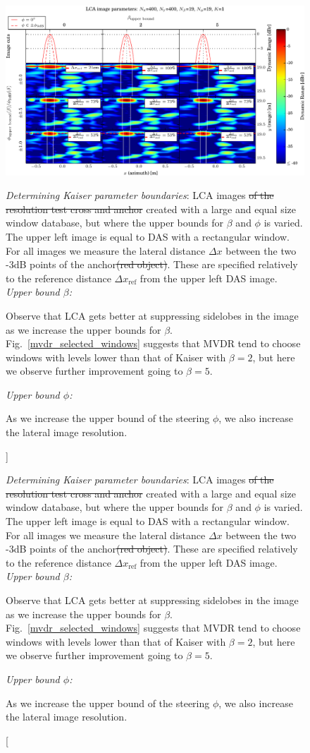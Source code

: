 \documentclass[10pt,journal,draftclsnofoot,onecolumn]{IEEEtran}
\let\MYoriglatexcaption\caption               %
\renewcommand{\caption}[2][\relax]{\MYoriglatexcaption[#2]{#2}}
\newcommand\Fig[1]{Fig.~\ref{#1}}
\newcommand\1{\vec 1}
\providecommand{\DIFdel}[1]{{\protect\color{red}\sout{#1}}}                      %
\providecommand{\DIFdelFL}[1]{\DIFdel{#1}} %
\providecommand{\DIFaddbeginFL}{} %
\providecommand{\DIFaddendFL}{} %
\providecommand{\DIFdelbeginFL}{} %
\providecommand{\DIFdelendFL}{} %
\begin{document}
\begin{figure}[t]%
\DIFdelbeginFL %
\DIFdelendFL \DIFaddbeginFL \includegraphics[width=\textwidth]{gfx/oversampling_mosaic_bounds.pdf}\DIFaddendFL %
\caption{\emph{Determining Kaiser parameter boundaries}: LCA images \DIFdelbeginFL \DIFdelFL{of the resolution test cross and anchor }\DIFdelendFL created with a large and equal size window database, but where the upper bounds for $\beta$ and $\phi$ is varied. The upper left image is equal to DAS with a rectangular window. For all images we measure the lateral distance $\Delta x$ between the two -3dB points of the anchor\DIFdelbeginFL \DIFdelFL{(red object)}\DIFdelendFL . These are specified relatively to the reference distance  $\Delta x_\text{ref}$ from the upper left DAS image.
\newline
\emph{Upper bound $\beta$:}\hfill
\parbox[t]{.89\linewidth}{Observe that LCA gets better at suppressing sidelobes in the image as we increase the upper bounds for $\beta$. \Fig{mvdr_selected_windows} suggests that MVDR tend to choose windows with levels lower than that of Kaiser with $\beta=2$, but here we observe further improvement going to $\beta=5$.}\newline
\emph{Upper bound $\phi$:}\hfill
\parbox[t]{.89\linewidth}{As we increase the upper bound of the steering $\phi$, we also increase the lateral image resolution. }
}\label{oversampling_mosaic_bounds}
\end{figure}

\end{document}

